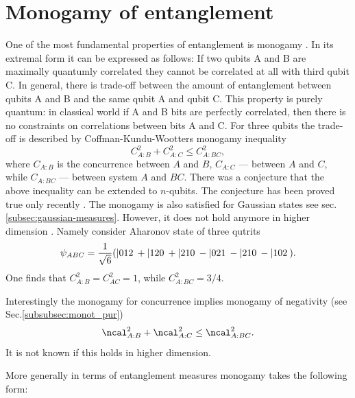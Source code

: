 \documentclass[twocolumn,aps,rmp]{revtex4}
\begin{document}
\section{Monogamy of entanglement}
\label{sec:monogamy}

One of the most fundamental properties of entanglement is monogamy
\cite{CoffmanKW-tangle,Terhal2000-laa}. In its extremal form it can be
expressed as follows: If two qubits A and B are maximally quantumly
correlated they cannot be correlated at all with third qubit C. In
general, there is trade-off between the amount of entanglement between
qubits A and B and the same qubit A and qubit C. This property is
purely quantum: in classical world if A and B bits are perfectly
correlated, then there is no constraints on correlations between bits
A and C. For three qubits the trade-off is described by Coffman-Kundu-Wootters
monogamy inequality
\begin{equation}
 C^2_{A:B}+ C^2_{A:C}\leq C^2_{A:BC},
\label{CKW}
\end{equation}
where $C_{A:B}$ is the concurrence between $A$ and $B$, $C_{A:C}$ ---
between $A$ and $C$, while $C_{A:BC}$ --- between system $A$ and
$BC$. There was a conjecture that the above inequality can be extended
to $n$-qubits. The conjecture has been proved true only recently
\cite{OsborneV-monogamy}. The monogamy is also satisfied for Gaussian states \cite{HiroshimaAI2007,GTangle_AdeFab}
see sec. \ref{subsec:gaussian-measures}.
However, it does not hold anymore in higher dimension \cite{Ou2006-monogamy-viol}.
Namely consider Aharonov state of three qutrits
\begin{equation}
\psi_{ABC}={1\over \sqrt 6}( |012\> +|120\> + |210\> -
|021\> - |210\> - |102\>).
\end{equation}
One finds that $C^2_{A:B}=C^2_{AC}=1$, while $C^2_{A:BC}=3/4$.

Interestingly the monogamy for concurrence
implies monogamy of negativity  (see Sec.\ref{subsubsec:monot_pur}) \cite {OuF2007}
\begin{equation}
\ncal^2_{A:B}+  \ncal^2_{A:C}\leq  \ncal^2_{A:BC}.
\label{neg}
\end{equation}
It is not known if this holds in higher dimension.

More generally in terms of entanglement measures monogamy takes the
following form:
\end{document}
